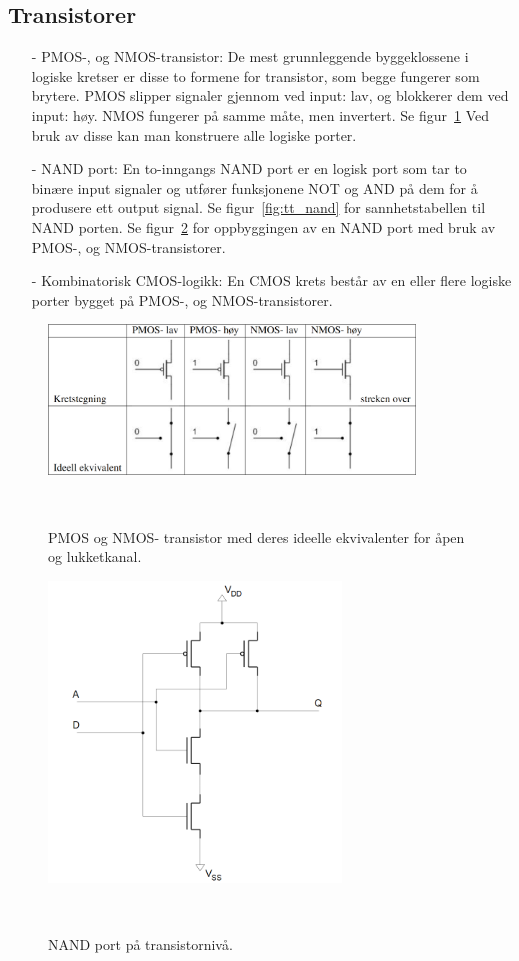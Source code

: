 \subsection{Transistorer}

    \begin{itemize}
        \item[-] PMOS-, og NMOS-transistor: De mest grunnleggende byggeklossene i logiske kretser er disse to formene for transistor, som begge fungerer som brytere.
        PMOS slipper signaler gjennom ved input: lav, og blokkerer dem ved input: høy.
        NMOS fungerer på samme måte, men invertert.
        Se figur~\ref{fig:pnmos_transistors} Ved bruk av disse kan man konstruere alle logiske porter.
        \item[-] NAND port: En to-inngangs NAND port er en logisk port som tar to binære input signaler og utfører funksjonene NOT og AND på dem for å produsere ett output signal.
        Se figur~\ref{fig:tt_nand} for sannhetstabellen til NAND porten.
        Se figur~\ref{fig:NAND_transistorlevel} for oppbyggingen av en NAND port med bruk av PMOS-, og NMOS-transistorer.
        \item[-] Kombinatorisk CMOS-logikk: En CMOS krets består av en eller flere logiske porter bygget på PMOS-, og NMOS-transistorer.
    \end{itemize}

    \begin{figure}[!htb]
        \centering
        \includegraphics[height=4cm]{figurer/PNMOS.png}
        \caption{PMOS og NMOS- transistor med deres ideelle ekvivalenter for åpen og lukketkanal.}
        \label{fig:pnmos_transistors}
        ~\cite{labhefte}
    \end{figure}

    \begin{figure}[!htb]
        \centering
        \includegraphics[height=8cm]{figurer/NAND_transistorlevel.png}
        \caption{NAND port på transistornivå.}
        \label{fig:NAND_transistorlevel}
        ~\cite{labhefte}
    \end{figure}

